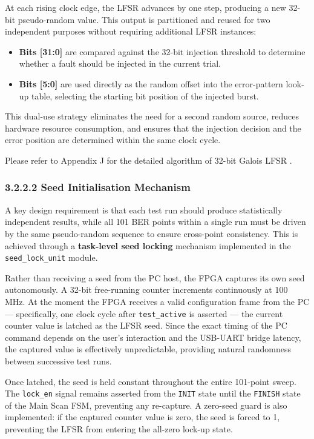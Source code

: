 \documentclass[
  12pt,
  a4paper]{report}
\providecommand{\tightlist}{%
  \setlength{\itemsep}{0pt}\setlength{\parskip}{0pt}}
\begin{document}
At each rising clock edge, the LFSR advances by one step, producing a
new 32-bit pseudo-random value. This output is partitioned and reused
for two independent purposes without requiring additional LFSR
instances:

\begin{itemize}
\tightlist
\item
  \textbf{Bits {[}31:0{]}} are compared against the 32-bit injection
  threshold to determine whether a fault should be injected in the
  current trial.
\item
  \textbf{Bits {[}5:0{]}} are used directly as the random offset into
  the error-pattern look-up table, selecting the starting bit position
  of the injected burst.
\end{itemize}

This dual-use strategy eliminates the need for a second random source,
reduces hardware resource consumption, and ensures that the injection
decision and the error position are determined within the same clock
cycle.

Please refer to Appendix J for the detailed algorithm of 32-bit Galois
LFSR .

\subsubsection{3.2.2.2 Seed Initialisation
Mechanism}\label{seed-initialisation-mechanism}

A key design requirement is that each test run should produce
statistically independent results, while all 101 BER points within a
single run must be driven by the same pseudo-random sequence to ensure
cross-point consistency. This is achieved through a \textbf{task-level
seed locking} mechanism implemented in the \texttt{seed\_lock\_unit}
module.

Rather than receiving a seed from the PC host, the FPGA captures its own
seed autonomously. A 32-bit free-running counter increments continuously
at 100 MHz. At the moment the FPGA receives a valid configuration frame
from the PC --- specifically, one clock cycle after
\texttt{test\_active} is asserted --- the current counter value is
latched as the LFSR seed. Since the exact timing of the PC command
depends on the user's interaction and the USB-UART bridge latency, the
captured value is effectively unpredictable, providing natural
randomness between successive test runs.

Once latched, the seed is held constant throughout the entire 101-point
sweep. The \texttt{lock\_en} signal remains asserted from the
\texttt{INIT} state until the \texttt{FINISH} state of the Main Scan
FSM, preventing any re-capture. A zero-seed guard is also implemented:
if the captured counter value is zero, the seed is forced to 1,
preventing the LFSR from entering the all-zero lock-up state.
\end{document}
